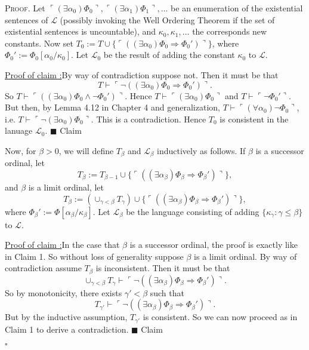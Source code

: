\documentclass[12pt]{article}
\newcounter{ProofCounter}
\newcounter{ClaimCounter}[ProofCounter]
\newenvironment{Proof}{\stepcounter{ProofCounter}\textsc{Proof.}}{\hfill$\square$}
\newenvironment{claim}[1]{\vspace{1mm}\stepcounter{ClaimCounter}\par\noindent\underline{\bf Claim \theClaimCounter:}\space#1}{}
\newenvironment{claimproof}[1]{\par\noindent\underline{Proof of claim \theClaimCounter:}\space#1}{\hfill $\blacksquare$ Claim \theClaimCounter}
\begin{document}
\begin{Proof}
  Let $\ulcorner (\exists \alpha_0) \Phi_0 \urcorner, \ulcorner (\exists \alpha_1)
  \Phi_1 \urcorner, \dots$ be an enumeration of the existential sentences of $\mathcal{L}$ (possibly invoking the Well Ordering Theorem if the set
  of existential sentences is uncountable), and $\kappa_0, \kappa_1, \dots$ the corresponds new constants. 
  Now set $T_0 := T \cup \{ \ulcorner((\exists \alpha_0) \Phi_0 \Rightarrow \Phi_0')\urcorner \}$, where $\Phi_0' := \Phi_0[\alpha_0 / \kappa_{0}]$.
  Let $\mathcal{L}_0$ be the result of adding the constant $\kappa_0$ to $\mathcal{L}$.
  \begin{claimproof}
    By way of contradiction suppose not. Then it must be that 
    \[ T \vdash \ulcorner \neg ((\exists \alpha_0) \Phi_0 \Rightarrow \Phi_0') \urcorner. \]
    So $T \vdash \ulcorner ((\exists \alpha_0) \Phi_0 \wedge \neg \Phi_0') \urcorner$. Hence $T \vdash \ulcorner (\exists \alpha_0) \Phi_0 \urcorner$ and 
    $T \vdash \ulcorner \neg \Phi_0'\urcorner$. But then, by Lemma 4.12 in Chapter 4 and generalization, $T \vdash \ulcorner (\forall \alpha_0) \neg
    \Phi_0 \urcorner$, i.e. $T \vdash \ulcorner \neg (\exists \alpha_0) \Phi_0 \urcorner$. This is a contradiction. Hence $T_0$ is consistent in the
    lanuage $\mathcal{L}_0$.
  \end{claimproof}

  Now, for $\beta > 0$, we will define $T_{\beta}$ and $\mathcal{L}_\beta$ inductively as follows. If $\beta$ is a successor ordinal, let 
  \[ T_\beta := T_{\beta - 1} \cup \{ \ulcorner((\exists \alpha_\beta) \Phi_\beta \Rightarrow \Phi_\beta')\urcorner \}, \]
  and $\beta$ is a limit ordinal, let 
  \[ T_\beta := (\cup_{\gamma < \beta} T_{\gamma} )\cup \{ \ulcorner((\exists \alpha_\beta) \Phi_\beta \Rightarrow \Phi_\beta')\urcorner \}, \]
  where $\Phi_\beta' := \Phi[\alpha_\beta / \kappa_{\beta}]$. Let $\mathcal{L}_\beta$ be the language consisting of adding $\{ \kappa_{\gamma} : \gamma \leq
  \beta \}$ to $\mathcal{L}$.

  \begin{claimproof}
    In the case that $\beta$ is a successor ordinal, the proof is exactly like in Claim 1. So without loss of generality suppose $\beta$ is a limit
    ordinal. By way of contradiction assume $T_\beta$ is inconsistent. Then it must be that 
    \[ \cup_{\gamma < \beta}T_\gamma \vdash \ulcorner \neg ((\exists \alpha_\beta) \Phi_\beta \Rightarrow \Phi_\beta') \urcorner. \]
    So by monotonicity, there exists $\gamma' < \beta$ such that 
    \[ T_{\gamma'} \vdash \ulcorner \neg ((\exists \alpha_\beta) \Phi_\beta \Rightarrow \Phi_\beta') \urcorner. \]
    But by the inductive assumption, $T_{\gamma'}$ is consistent. So we can now proceed as in Claim 1 to derive a contradiction.
  \end{claimproof}


\end{Proof}
\end{document}
